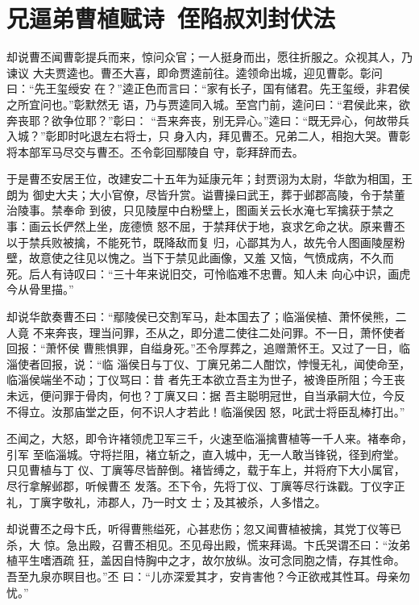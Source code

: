 \chapter{兄逼弟曹植赋诗~侄陷叔刘封伏法}

却说曹丕闻曹彰提兵而来，惊问众官；一人挺身而出，愿往折服之。众视其人，乃谏议
大夫贾逵也。曹丕大喜，即命贾逵前往。逵领命出城，迎见曹彰。彰问曰：“先王玺绶安
在？”逵正色而言曰：“家有长子，国有储君。先王玺绶，非君侯之所宜问也。”彰默然无
语，乃与贾逵同入城。至宫门前，逵问曰：“君侯此来，欲奔丧耶？欲争位耶？”彰曰：
“吾来奔丧，别无异心。”逵曰：“既无异心，何故带兵入城？”彰即时叱退左右将士，只
身入内，拜见曹丕。兄弟二人，相抱大哭。曹彰将本部军马尽交与曹丕。丕令彰回鄢陵自
守，彰拜辞而去。

于是曹丕安居王位，改建安二十五年为延康元年；封贾诩为太尉，华歆为相国，王朗为
御史大夫；大小官僚，尽皆升赏。谥曹操曰武王，葬于邺郡高陵，令于禁董治陵事。禁奉命
到彼，只见陵屋中白粉壁上，图画关云长水淹七军擒获于禁之事：画云长俨然上坐，庞德愤
怒不屈，于禁拜伏于地，哀求乞命之状。原来曹丕以于禁兵败被擒，不能死节，既降敌而复
归，心鄙其为人，故先令人图画陵屋粉壁，故意使之往见以愧之。当下于禁见此画像，又羞
又恼，气愤成病，不久而死。后人有诗叹曰：“三十年来说旧交，可怜临难不忠曹。知人未
向心中识，画虎今从骨里描。”

却说华歆奏曹丕曰：“鄢陵侯已交割军马，赴本国去了；临淄侯植、萧怀侯熊，二人竟
不来奔丧，理当问罪，丕从之，即分遣二使往二处问罪。不一日，萧怀使者回报：“萧怀侯
曹熊惧罪，自缢身死。”丕令厚葬之，追赠萧怀王。又过了一日，临淄使者回报，说：“临
淄侯日与丁仪、丁廙兄弟二人酣饮，悖慢无礼，闻使命至，临淄侯端坐不动；丁仪骂曰：昔
者先王本欲立吾主为世子，被谗臣所阻；今王丧未远，便问罪于骨肉，何也？丁廙又曰：据
吾主聪明冠世，自当承嗣大位，今反不得立。汝那庙堂之臣，何不识人才若此！临淄侯因
怒，叱武士将臣乱棒打出。”

丕闻之，大怒，即令许褚领虎卫军三千，火速至临淄擒曹植等一千人来。褚奉命，引军
至临淄城。守将拦阻，褚立斩之，直入城中，无一人敢当锋锐，径到府堂。只见曹植与丁
仪、丁廙等尽皆醉倒。褚皆缚之，载于车上，并将府下大小属官，尽行拿解邺郡，听候曹丕
发落。丕下令，先将丁仪、丁廙等尽行诛戳。丁仪字正礼，丁廙字敬礼，沛郡人，乃一时文
士；及其被杀，人多惜之。

却说曹丕之母卞氏，听得曹熊缢死，心甚悲伤；忽又闻曹植被擒，其党丁仪等已杀，大
惊。急出殿，召曹丕相见。丕见母出殿，慌来拜谒。卞氏哭谓丕曰：“汝弟植平生嗜酒疏
狂，盖因自恃胸中之才，故尔放纵。汝可念同胞之情，存其性命。吾至九泉亦瞑目也。”丕
曰：“儿亦深爱其才，安肯害他？今正欲戒其性耳。母亲勿忧。”

